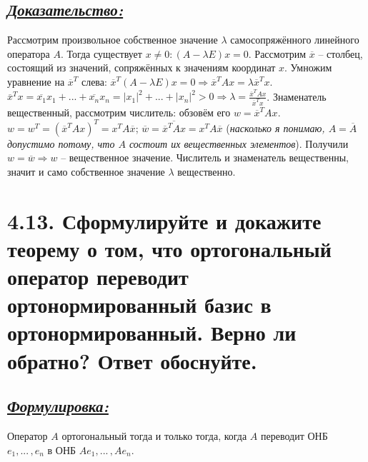 \documentclass{article}
\begin{document}
\subsection*{\Large \underline{\textit{Доказательство: }}}
Рассмотрим произвольное собственное значение $\lambda$ самосопряжённого линейного оператора $A$. Тогда существует $x \ne 0 : (A - \lambda E)x = 0$. Рассмотрим $\overline{x}$ -- столбец, состоящий из значений, сопряжённых к значениям координат $x$. Умножим уравнение на $\overline{x}^T$ слева: $\overline{x}^T(A - \lambda E)x = 0 \Rightarrow \overline{x}^TAx = \lambda\overline{x}^Tx$. 
\newline $\overline{x}^Tx = \overline{x_1}x_1 + ... + \overline{x_n}x_n = |x_1|^2 + ... + |x_n|^2 > 0 \Rightarrow \boxed{\lambda = \frac{\overline{x}^TAx}{\overline{x}^Tx}}$. 
\newline Знаменатель вещественный, рассмотрим числитель: обзовём его $w = \overline{x}^TAx$. 
\newline $w = w^T = (\overline{x}^TAx)^T = x^TA\overline{x}$; $\overline{w} = \overline{\overline{x}^TAx} = x^TA\overline{x}$ (\textit{насколько я понимаю, $A = \overline{A}$ допустимо потому, что $A$ состоит их вещественных элементов}). Получили $w = \overline{w} \Rightarrow w$ -- вещественное значение. Числитель и знаменатель вещественны, значит и само собственное значение $\lambda$ вещественно.

\section*{\LARGE 4.13. Сформулируйте и докажите теорему о том, что ортогональный оператор переводит ортонормированный базис в ортонормированный. Верно ли обратно? Ответ обоснуйте.  }
\subsection*{\Large \underline{\textit{Формулировка: }}}
Оператор $A$ ортогональный тогда и только тогда, когда $A$ переводит ОНБ $e_1, ...\,, e_n$ в ОНБ $Ae_1, ...\,, Ae_n$.
\end{document}
